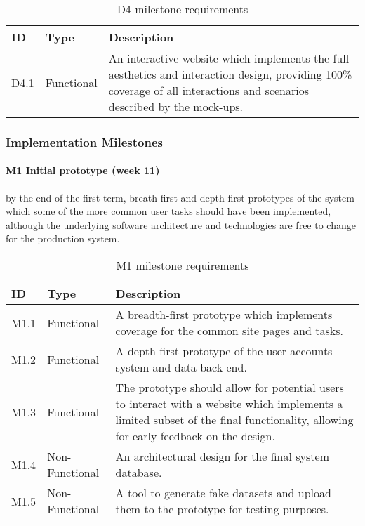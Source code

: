 \begin{table}[H]
\centering
\begin{tabular}{ l l p{12cm} }
\textbf{ID} & \textbf{Type} & \textbf{Description}\\ \hline

D4.1 & Functional & An interactive website which implements the full aesthetics
and interaction design, providing 100\% coverage of all interactions and
scenarios described by the mock-ups.\\

\hline
\end{tabular}
\caption{D4 milestone requirements}
\label{tab:d4-requirements}
\end{table}

\subsubsection{Implementation Milestones}

\paragraph{M1 Initial prototype (week 11)} by the end of the first term,
breath-first and depth-first prototypes of the system which some of the more
common user tasks should have been implemented, although the underlying software
architecture and technologies are free to change for the production system.

\begin{table}[H]
\centering
\begin{tabular}{ l l p{12cm} }
\textbf{ID} & \textbf{Type} & \textbf{Description}\\ \hline

M1.1 & Functional & A breadth-first prototype which implements coverage for the
common site pages and tasks.\\

M1.2 & Functional & A depth-first prototype of the user accounts system and data
back-end.\\

M1.3 & Functional & The prototype should allow for potential users to interact
with a website which implements a limited subset of the final functionality,
allowing for early feedback on the design.\\

M1.4 & Non-Functional & An architectural design for the final system database.\\

M1.5 & Non-Functional & A tool to generate fake datasets and upload them to the
prototype for testing purposes.\\

\hline
\end{tabular}
\caption{M1 milestone requirements}
\label{tab:m1-requirements}
\end{table}

